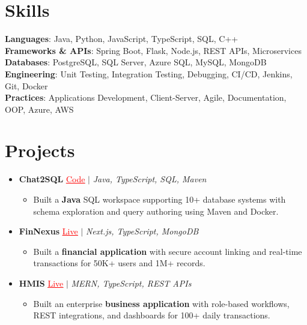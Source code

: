\documentclass[letterpaper,10pt]{article}
\newcommand{\resumeItem}[1]{\item\small{{#1 \vspace{-2pt}}}}
\newcommand{\resumeProjectHeading}[1]{\item \small #1 \vspace{-2pt}}
\newcommand{\resumeSubHeadingListStart}{\begin{itemize}[leftmargin=0.0in, label={}]}
\newcommand{\resumeSubHeadingListEnd}{\end{itemize}}
\newcommand{\resumeProjItemListStart}{\begin{itemize}[leftmargin=0.15in,label=\textbullet,itemsep=0pt,topsep=0pt,parsep=0pt,partopsep=0pt]}
\newcommand{\resumeProjItemListEnd}{\end{itemize}\vspace{-4pt}}
\begin{document}
\section{Skills}
\begin{itemize}[leftmargin=0.15in, label={}]
\small{\item{
\textbf{Languages}: Java, Python, JavaScript, TypeScript, SQL, C++ \\
\textbf{Frameworks \& APIs}: Spring Boot, Flask, Node.js, REST APIs, Microservices \\
\textbf{Databases}: PostgreSQL, SQL Server, Azure SQL, MySQL, MongoDB \\
\textbf{Engineering}: Unit Testing, Integration Testing, Debugging, CI/CD, Jenkins, Git, Docker \\
\textbf{Practices}: Applications Development, Client-Server, Agile, Documentation, OOP, Azure, AWS
}}
\end{itemize}
\vspace{-6pt}
\section{Projects}
\resumeSubHeadingListStart
\vspace{-2pt}
\resumeProjectHeading{\textbf{Chat2SQL} {\href{https://github.com/SAHAJ-BHADJA/Chat2SQL}{\textcolor{red}{\underline{Code}}}} $|$ \emph{Java, TypeScript, SQL, Maven}}
\resumeProjItemListStart
\resumeItem{Built a \textbf{Java} SQL workspace supporting 10+ database systems with schema exploration and query authoring using Maven and Docker.}
\resumeProjItemListEnd
\vspace{3pt}
\resumeProjectHeading{\textbf{FinNexus} {\href{https://fin-nexus.vercel.app/}{\textcolor{red}{\underline{Live}}}} $|$ \emph{Next.js, TypeScript, MongoDB}}
\resumeProjItemListStart
\resumeItem{Built a \textbf{financial application} with secure account linking and real-time transactions for 50K+ users and 1M+ records.}
\resumeProjItemListEnd
\vspace{3pt}
\resumeProjectHeading{\textbf{HMIS} {\href{https://hims-rouge.vercel.app/}{\textcolor{red}{\underline{Live}}}} $|$ \emph{MERN, TypeScript, REST APIs}}
\resumeProjItemListStart
\resumeItem{Built an enterprise \textbf{business application} with role-based workflows, REST integrations, and dashboards for 100+ daily transactions.}
\resumeProjItemListEnd
\resumeSubHeadingListEnd
\end{document}
